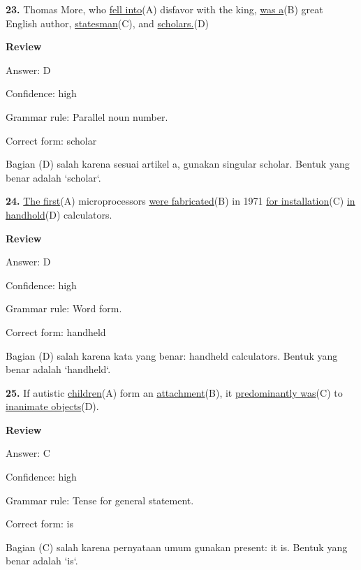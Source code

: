 \documentclass[12pt]{article}
\begin{document}
\par
\vspace{\questionblockgap}
\noindent\textbf{23.} Thomas More, who \uline{fell into}(A) disfavor with the king, \uline{was a}(B) great English author, \uline{statesman}(C), and \uline{scholars.}(D)
\par
\begingroup
\setlength{\parskip}{0pt}
\setlength{\parindent}{0pt}
\textbf{Review}\par
Answer: D\par
Confidence: high\par
Grammar rule: Parallel noun number.\par
Correct form: scholar\par
Bagian (D) salah karena sesuai artikel a, gunakan singular scholar. Bentuk yang benar adalah `scholar`.\par
\endgroup
\par
\vspace{\questionblockgap}
\noindent\textbf{24.} \uline{The first}(A) microprocessors \uline{were fabricated}(B) in 1971 \uline{for installation}(C) \uline{in handhold}(D) calculators.
\par
\begingroup
\setlength{\parskip}{0pt}
\setlength{\parindent}{0pt}
\textbf{Review}\par
Answer: D\par
Confidence: high\par
Grammar rule: Word form.\par
Correct form: handheld\par
Bagian (D) salah karena kata yang benar: handheld calculators. Bentuk yang benar adalah `handheld`.\par
\endgroup
\par
\vspace{\questionblockgap}
\noindent\textbf{25.} If autistic \uline{children}(A) form an \uline{attachment}(B), it \uline{predominantly was}(C) to \uline{inanimate objects}(D).
\par
\begingroup
\setlength{\parskip}{0pt}
\setlength{\parindent}{0pt}
\textbf{Review}\par
Answer: C\par
Confidence: high\par
Grammar rule: Tense for general statement.\par
Correct form: is\par
Bagian (C) salah karena pernyataan umum gunakan present: it is. Bentuk yang benar adalah `is`.\par
\endgroup
\par
\end{document}
